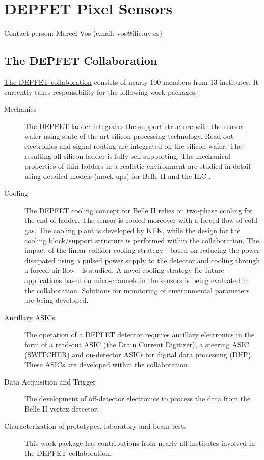 \section{DEPFET Pixel Sensors}
Contact person: Marcel Vos (email: vos@ific.uv.es)
\label{sec:DEPFET}
\subsection{The DEPFET Collaboration}
\href{http://www.hll.mpg.de/twiki/bin/view/DEPFET/CollaborationList}{The DEPFET collaboration} consists of nearly 100 members from 13 institutes. It currently takes responsibility for the following work packages:
\begin{description}
\item[Mechanics] {The DEPFET ladder integrates the support structure with the sensor wafer using state-of-the-art silicon processing technology. Read-out electronics and signal routing are integrated on the silicon wafer. The resulting all-silicon ladder is fully self-supporting. The mechanical properties of thin ladders in a realistic environment are studied in detail using detailed models (mock-ups) for Belle II and the ILC .}
\item[Cooling] {The DEPFET cooling concept for Belle II relies on two-phase  cooling for the end-of-ladder. The sensor is cooled moreover with a forced flow of cold gas. The  cooling plant is developed by KEK, while the design for the cooling block/support structure is performed within the collaboration. The impact of the linear collider cooling strategy - based on reducing the power dissipated using a pulsed power supply to the detector and cooling through a forced air flow - is studied. A novel cooling strategy for future applications based on mico-channels in the sensors is being evaluated in the collaboration. Solutions for monitoring of environmental parameters are being developed.}
\item[Ancillary ASICs] {The operation of a DEPFET detector requires ancillary electronics in the form of a read-out ASIC (the Drain Current Digitizer), a steering ASIC (SWITCHER) and on-detector ASICs for digital data processing (DHP). These ASICs are developed within the collaboration.}
\item[Data Acquisition and Trigger] {The development of off-detector electronics to process the data from the Belle II vertex detector.}
\item[Characterization of prototypes, laboratory and beam tests] {This work package has contributions from nearly all institutes involved in the DEPFET collaboration.}
\end{description}

